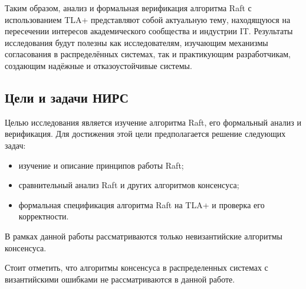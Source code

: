 Таким образом, анализ и формальная верификация алгоритма Raft с использованием
TLA+ представляют собой актуальную тему, находящуюся на пересечении интересов
академического сообщества и индустрии IT. Результаты исследования будут полезны
как исследователям, изучающим механизмы согласования в распределённых системах,
так и практикующим разработчикам, создающим надёжные и отказоустойчивые системы.

\subsection*{Цели и задачи НИРС}

Целью исследования является изучение алгоритма Raft, его формальный
анализ и верификация. Для достижения этой цели предполагается решение
следующих задач:

\begin{itemize}
    \item изучение и описание принципов работы Raft;
    \item сравнительный анализ Raft и других алгоритмов консенсуса;
    \item формальная спецификация алгоритма Raft на TLA+ и проверка его корректности.
\end{itemize}

В рамках данной работы рассматриваются только невизантийские алгоритмы
консенсуса.

Стоит отметить, что алгоритмы консенсуса в распределенных системах с
византийскими ошибками не рассматриваются в данной работе.
